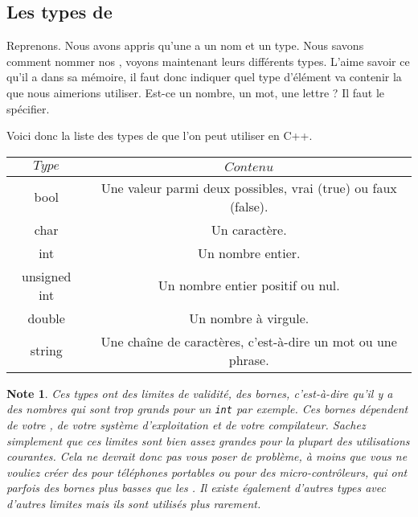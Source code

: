\subsection{Les types de \varis}
Reprenons. Nous avons appris qu'une \vari a un nom et un type. Nous savons comment nommer nos \varis, voyons maintenant leurs différents types. L'\ordi aime savoir ce qu'il a dans sa mémoire, il faut donc indiquer quel type d'élément va contenir la \vari que nous aimerions utiliser. Est-ce un nombre, un mot, une lettre ? Il faut le spécifier.

Voici donc la liste des types de \varis que l'on peut utiliser en C++.


\begin{tabular}{cc}
	$Type$ & $Contenu$ \\
	\toprule
	bool & Une valeur parmi deux possibles, vrai (true) ou faux (false). \\
	\midrule
	char & Un caractère. \\
	\midrule
	int & Un nombre entier. \\
	\midrule
	unsigned int & Un nombre entier positif ou nul. \\
	\midrule
	double & Un nombre à virgule. \\
	\midrule
	string & Une chaîne de caractères, c'est-à-dire un mot ou une phrase. \\
	\bottomrule
\end{tabular}

\newtheorem{ bornes}{Note}
\begin{ bornes}
	Ces types ont des limites de validité, des bornes, c'est-à-dire qu'il y a des nombres qui sont trop grands pour un \lstinline|int| par exemple. Ces bornes dépendent de votre \ordi, de votre système d'exploitation et de votre compilateur. Sachez simplement que ces limites sont bien assez grandes pour la plupart des utilisations courantes. 
	Cela ne devrait donc pas vous poser de problème, à moins que vous ne vouliez créer des \progs pour téléphones portables ou pour des micro-contrôleurs, qui ont parfois des bornes plus basses que les \ordis.
	Il existe également d'autres types avec d'autres limites mais ils sont utilisés plus rarement.
\end{ bornes}


